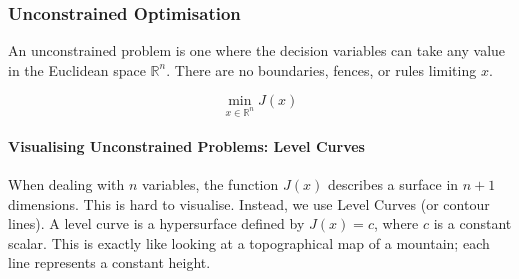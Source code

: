 \subsubsection{Unconstrained Optimisation}

An unconstrained problem is one where the decision variables can take any value in the Euclidean space $\mathbb{R}^n$. There are no boundaries, fences, or rules limiting $x$.

\begin{equation}
	\min_{x \in \mathbb{R}^n} J(x)
\end{equation}

\paragraph*{Visualising Unconstrained Problems: Level Curves}

When dealing with $n$ variables, the function $J(x)$ describes a surface in $n+1$ dimensions. This is hard to visualise. Instead, we use {Level Curves} (or contour lines). A level curve is a hypersurface defined by $J(x) = c$, where $c$ is a constant scalar. This is exactly like looking at a topographical map of a mountain; each line represents a constant height.

